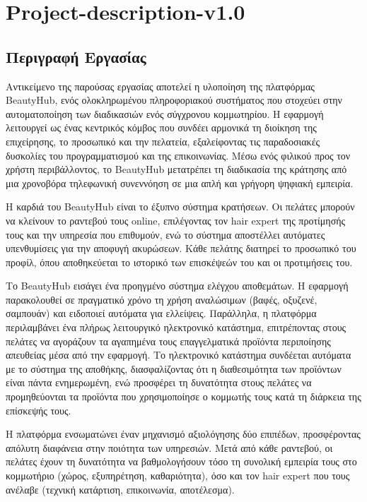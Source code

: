 \documentclass[12pt,a4paper,twoside]{book}
\makeatletter
\renewcommand{\headrulewidth}{0pt} %
\renewcommand{\headrulewidth}{0pt}
\renewcommand{\sectionmark}[1]{\markboth{#1}{}}
\renewcommand{\subsectionmark}[1]{\markright{#1}}
\let\oldtableofcontents\tableofcontents
\renewcommand{\tableofcontents}{%
    \clearpage
    \thispagestyle{empty}
    \pagestyle{tocstyle}
    \oldtableofcontents %
    \clearpage
    \pagestyle{fancy}
    \fancyhead[LE]{\thepage} %
    \fancyhead[CE]{\leftmark} %
    \fancyhead[RE]{ΚΕΦ. \thechapter} %

    \fancyhead[LO]{\thesection} %
    \fancyhead[CO]{\rightmark} %
    \fancyhead[RO]{\thepage} %

    \renewcommand{\headrulewidth}{0.4pt} %

    \renewcommand{\chaptermark}[1]{\markboth{##1}{}}
    \renewcommand{\sectionmark}[1]{%
        \markright{##1}%
    }
    \renewcommand{\subsectionmark}[1]{}
}
\renewcommand\sectionmark[1]{%
  \markright{%
    \ifnum \c@secnumdepth >\z@
      \thesection\quad
    \fi
    #1}}
\makeatother
\begin{document}
\tableofcontents

\chapter{Project-description-v1.0}
\section{Περιγραφή Εργασίας}
Αντικείμενο της παρούσας εργασίας αποτελεί η υλοποίηση της πλατφόρμας BeautyHub, ενός ολοκληρωμένου πληροφοριακού συστήματος που στοχεύει στην αυτοματοποίηση των διαδικασιών ενός σύγχρονου κομμωτηρίου. Η εφαρμογή λειτουργεί ως ένας κεντρικός κόμβος που συνδέει αρμονικά τη διοίκηση της επιχείρησης, το προσωπικό και την πελατεία, εξαλείφοντας τις παραδοσιακές δυσκολίες του προγραμματισμού και της επικοινωνίας. Μέσω ενός φιλικού προς τον χρήστη περιβάλλοντος, το BeautyHub μετατρέπει τη διαδικασία της κράτησης από μια χρονοβόρα τηλεφωνική συνεννόηση σε μια απλή και γρήγορη ψηφιακή εμπειρία.

Η καρδιά του BeautyHub είναι το έξυπνο σύστημα κρατήσεων. Οι πελάτες μπορούν να κλείνουν το ραντεβού τους online, επιλέγοντας τον hair expert της προτίμησής τους και την υπηρεσία που επιθυμούν, ενώ το σύστημα αποστέλλει αυτόματες υπενθυμίσεις για την αποφυγή ακυρώσεων. Κάθε πελάτης διατηρεί το προσωπικό του προφίλ, όπου αποθηκεύεται το ιστορικό των επισκέψεών του και οι προτιμήσεις του.

Το BeautyHub εισάγει ένα προηγμένο σύστημα ελέγχου αποθεμάτων. Η εφαρμογή παρακολουθεί σε πραγματικό χρόνο τη χρήση αναλώσιμων (βαφές, οξυζενέ, σαμπουάν) και ειδοποιεί αυτόματα για ελλείψεις. Παράλληλα, η πλατφόρμα περιλαμβάνει ένα πλήρως λειτουργικό ηλεκτρονικό κατάστημα, επιτρέποντας στους πελάτες να αγοράζουν τα αγαπημένα τους επαγγελματικά προϊόντα περιποίησης απευθείας μέσα από την εφαρμογή. Το ηλεκτρονικό κατάστημα συνδέεται αυτόματα με το σύστημα της αποθήκης, διασφαλίζοντας ότι η διαθεσιμότητα των προϊόντων είναι πάντα ενημερωμένη, ενώ προσφέρει τη δυνατότητα στους πελάτες να προμηθεύονται τα προϊόντα που χρησιμοποίησε ο κομμωτής τους κατά τη διάρκεια της επίσκεψής τους.

Η πλατφόρμα ενσωματώνει έναν μηχανισμό αξιολόγησης δύο επιπέδων, προσφέροντας απόλυτη διαφάνεια στην ποιότητα των υπηρεσιών. Μετά από κάθε ραντεβού, οι πελάτες έχουν τη δυνατότητα να βαθμολογήσουν τόσο τη συνολική εμπειρία τους στο κομμωτήριο (χώρος, εξυπηρέτηση, καθαριότητα), όσο και τον hair expert που τους ανέλαβε (τεχνική κατάρτιση, επικοινωνία, αποτέλεσμα). 
\end{document}
